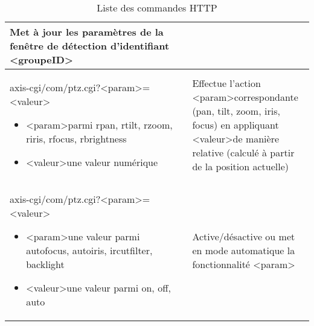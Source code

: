\begin{table}[H]
\begin{tabular}{|p{0.6\linewidth}|p{0.4\linewidth}|}
Met à jour les paramètres de la fenêtre de détection d'identifiant \textless groupeID\textgreater \\
\hline
axis-cgi/com/ptz.cgi?\textless param\textgreater =\textless valeur\textgreater 
\begin{itemize}
  \item \textless param\textgreater  parmi { rpan, rtilt, rzoom, riris, rfocus, rbrightness }
  \item \textless valeur\textgreater  une valeur numérique
\end{itemize} &
Effectue l'action \textless param\textgreater correspondante (pan, tilt, zoom, iris, focus) en
appliquant \textless valeur\textgreater  de manière relative (calculé à partir de la position actuelle)\\
\hline
axis-cgi/com/ptz.cgi?\textless param\textgreater =\textless valeur\textgreater 
\begin{itemize}
  \item \textless param\textgreater  une valeur parmi { autofocus, autoiris, ircutfilter, backlight }
  \item \textless valeur\textgreater  une valeur parmi { on, off, auto}
\end{itemize} &
Active/désactive ou met en mode automatique la fonctionnalité \textless param\textgreater\\
\hline
\end{tabular}
\caption{Liste des commandes HTTP}
\end{table}
